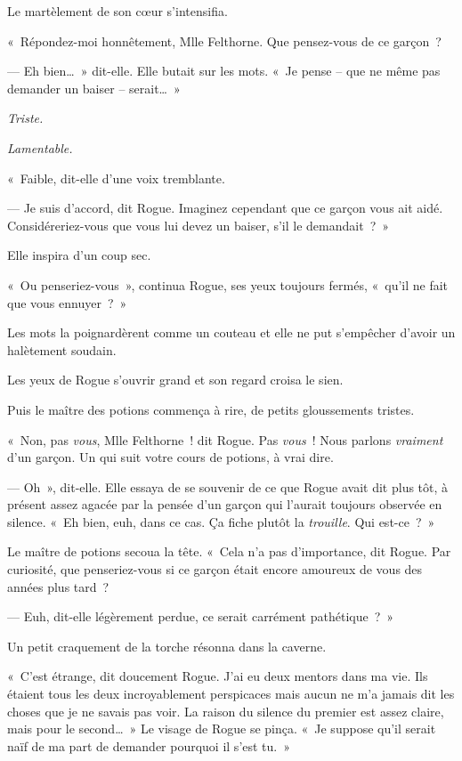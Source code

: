 Le martèlement de son cœur s'intensifia.

«~Répondez-moi honnêtement, Mlle Felthorne.
Que pensez-vous de ce garçon~?

--- Eh bien…~»
dit-elle.
Elle butait sur les mots.
«~Je pense -- que ne même pas demander un baiser -- serait…~»

\emph{Triste.}

\emph{Lamentable.}

«~Faible, dit-elle d'une voix tremblante.

--- Je suis d'accord, dit Rogue.
Imaginez cependant que ce garçon vous ait aidé.
Considéreriez-vous que vous lui devez un baiser, s'il le demandait~?~»

Elle inspira d'un coup sec.

«~Ou penseriez-vous~», continua Rogue, ses yeux toujours fermés, «~qu'il ne fait que vous ennuyer~?~»

Les mots la poignardèrent comme un couteau et elle ne put s'empêcher d'avoir un halètement soudain.

Les yeux de Rogue s'ouvrir grand et son regard croisa le sien.

Puis le maître des potions commença à rire, de petits gloussements tristes.

«~Non, pas \emph{vous}, Mlle Felthorne~! dit Rogue.
Pas \emph{vous}~!
Nous parlons \emph{vraiment} d'un garçon.
Un qui suit votre cours de potions, à vrai dire.

--- Oh~», dit-elle.
Elle essaya de se souvenir de ce que Rogue avait dit plus tôt, à présent assez agacée par la pensée d'un garçon qui l'aurait toujours observée en silence.
«~Eh bien, euh, dans ce cas.
Ça fiche plutôt la \emph{trouille}.
Qui est-ce~?~»

Le maître de potions secoua la tête.
«~Cela n'a pas d'importance, dit Rogue.
Par curiosité, que penseriez-vous si ce garçon était encore amoureux de vous des années plus tard~?

--- Euh, dit-elle légèrement perdue, ce serait carrément pathétique~?~»

Un petit craquement de la torche résonna dans la caverne.

«~C'est étrange, dit doucement Rogue.
J'ai eu deux mentors dans ma vie.
Ils étaient tous les deux incroyablement perspicaces mais aucun ne m'a jamais dit les choses que je ne savais pas voir.
La raison du silence du premier est assez claire, mais pour le second…~»
Le visage de Rogue se pinça.
«~Je suppose qu'il serait naïf de ma part de demander pourquoi il s'est tu.~»

